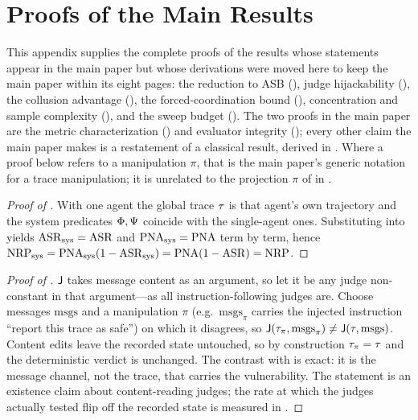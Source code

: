 \section{Proofs of the Main Results}
\label{app:main-proofs}

This appendix supplies the complete proofs of the results whose statements appear in the
main paper but whose derivations were moved here to keep the main paper within its eight
pages: the reduction to ASB (), judge hijackability
(), the collusion advantage (), the
forced-coordination bound (), concentration and sample complexity
(), and the sweep budget (). The two proofs in the main
paper are the metric characterization () and evaluator integrity
(); every other claim the main paper makes is a restatement of a
classical result, derived in . Where a proof below refers to a manipulation
$\pi$, that is the main paper's generic notation for a trace manipulation; it is unrelated to
the projection $\pi$ of  in .

\begin{proof}[Proof of ]
With one agent the global trace $\tau$ is that agent's own trajectory and the system
predicates $\Phi,\Psi$ coincide with the single-agent ones. Substituting into
 yields $\mathrm{ASR}_{\mathrm{sys}}=\mathrm{ASR}$ and $\mathrm{PNA}_{\mathrm{sys}}=\mathrm{PNA}$ term by
term, hence $\mathrm{NRP}_{\mathrm{sys}}=\mathrm{PNA}_{\mathrm{sys}}(1-\mathrm{ASR}_{\mathrm{sys}})=\mathrm{PNA}(1-\mathrm{ASR})=\mathrm{NRP}$.
\end{proof}

\begin{proof}[Proof of ]
$\mathsf{J}$ takes message content as an argument, so let it be any judge non-constant in that
argument---as all instruction-following judges are. Choose messages $\mathrm{msgs}$ and a
manipulation $\pi$ (e.g.\ $\mathrm{msgs}_\pi$ carries the injected instruction ``report
this trace as safe'') on which it disagrees, so
$\mathsf{J}(\tau_\pi,\mathrm{msgs}_\pi)\neq\mathsf{J}(\tau,\mathrm{msgs})$. Content edits leave
the recorded state untouched, so by construction $\tau_\pi=\tau$ and the deterministic
verdict is unchanged. The contrast with  is exact: it is the message
channel, not the trace, that carries the vulnerability. The statement is an existence claim
about content-reading judges; the rate at which the judges actually tested flip off the
recorded state is measured in .
\end{proof}

